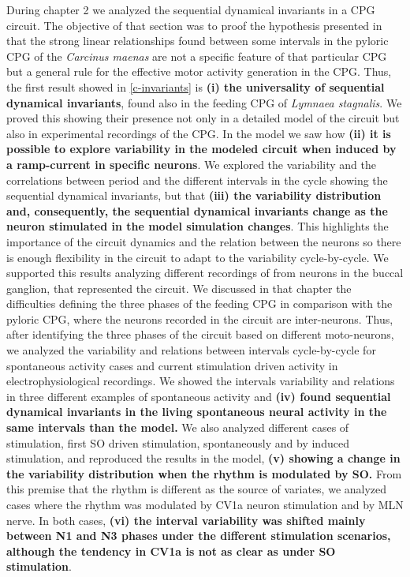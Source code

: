 During chapter 2 we analyzed the sequential dynamical invariants in a CPG circuit. The objective of that section was to proof the hypothesis presented in \cite{elices_robust_2019} that the strong linear relationships found between some intervals in the pyloric CPG of the \textit{Carcinus maenas} are not a specific feature of that particular CPG but a general rule for the effective motor activity generation in the CPG. Thus, the first result showed in \ref{c-invariants} is \textbf{(i) the universality of sequential dynamical invariants}, found also in the feeding CPG of \textit{Lymnaea stagnalis}. We proved this showing their presence not only in a detailed model of the circuit but also in experimental recordings of the CPG. In the model we saw how \textbf{(ii) it is possible to explore variability in the modeled circuit when induced by a ramp-current in specific neurons}. We explored the variability and the correlations between period and the different intervals in the cycle showing the sequential dynamical invariants, but that \textbf{(iii) the variability distribution and, consequently, the sequential dynamical invariants change as the neuron stimulated in the model simulation changes}. This highlights the importance of the circuit dynamics and the relation between the neurons so there is enough flexibility in the circuit to adapt to the variability cycle-by-cycle. We supported this results analyzing different recordings of from neurons in the buccal ganglion, that represented the circuit. We discussed in that chapter the difficulties defining the three phases of the feeding CPG in comparison with the pyloric CPG, where the neurons recorded in the circuit are inter-neurons. Thus, after identifying the three phases of the circuit based on different moto-neurons, we analyzed the variability and relations between intervals cycle-by-cycle for spontaneous activity cases and current stimulation driven activity in electrophysiological recordings. We showed the intervals variability and relations in three different examples of spontaneous activity and \textbf{(iv) found sequential dynamical invariants in the living spontaneous neural activity in the same intervals than the model.} We also analyzed different cases of stimulation, first SO driven stimulation, spontaneously and by induced stimulation, and reproduced the results in the model, \textbf{(v) showing a change in the variability distribution when the rhythm is modulated by SO.} From this premise that the rhythm is different as the source of variates, we analyzed cases where the rhythm was modulated by CV1a neuron stimulation and by MLN nerve. In both cases, \textbf{(vi) the interval variability was shifted mainly between N1 and N3 phases under the different stimulation scenarios, although the tendency in CV1a is not as clear as under SO stimulation}.

